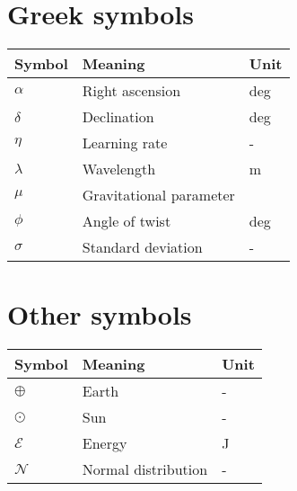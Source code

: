 \section*{Greek symbols}
\begin{table}[h!]
\begin{tabular}{lll}
\textbf{Symbol} & \textbf{Meaning}        & \textbf{Unit} \\ \hline
$\alpha$           & Right ascension         & deg           \\
$\delta$           & Declination             & deg           \\
$\eta$             & Learning rate           & -             \\
$\lambda$          & Wavelength              & m             \\
$\mu$              & Gravitational parameter &               \\
$\phi$             & Angle of twist          & deg           \\
$\sigma$           & Standard deviation      & -            
\end{tabular}
\end{table}
\section*{Other symbols}
\begin{table}[h!]
\begin{tabular}{lll}
\textbf{Symbol} & \textbf{Meaning}    & \textbf{Unit} \\ \hline
$\oplus$      & Earth               & -             \\
$\odot$     & Sun                 & -             \\
$\mathcal{E}$       & Energy              & J             \\
$\mathcal{N}$       & Normal distribution & -            
\end{tabular}
\end{table}
